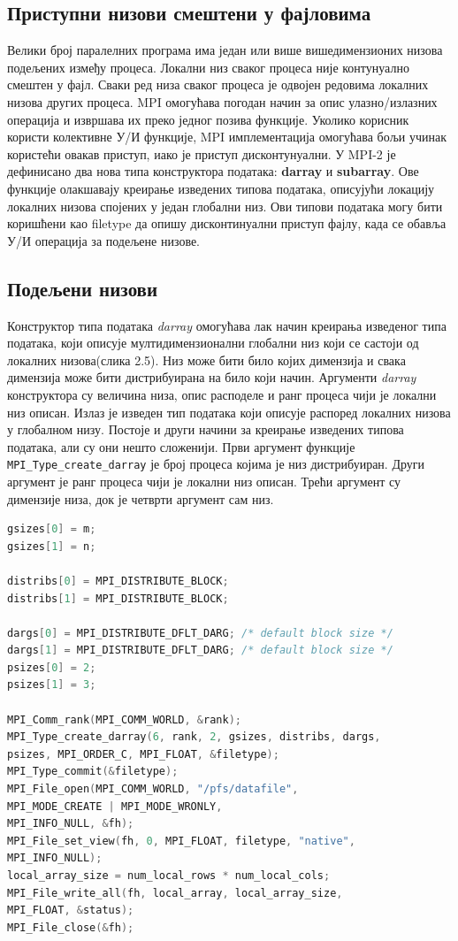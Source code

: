 \subsection{Приступни низови  смештени у фајловима}
Велики број паралелних програма има један или више вишедимензионих низова подељених између процеса. Локални низ сваког процеса није контунуално смештен у фајл. Сваки ред низа сваког процеса
је одвојен редовима локалних низова других процеса. MPI омогућава погодан начин за опис улазно/излазних операција и извршава их преко једног позива функције. Уколико корисник користи колективне У/И функције, MPI имплементација омогућава бољи учинак користећи овакав приступ, иако је приступ дисконтунуални. У MPI-2 је дефинисано два нова типа конструктора података: \textbf{darray} и \textbf{subarray}. Ове функције  олакшавају креирање изведених типова података, описујући локацију локалних низова спојених у један глобални низ. Ови типови података могу бити коришћени као filetype да опишу дисконтинуални приступ фајлу, када се обавља У/И операција за подељене низове.

\subsection{Подељени низови}
Конструктор типа података \textit{darray} омогућава лак начин креирања изведеног типа података, који описује мултидимензионални глобални низ који се састоји од локалних низова(слика 2.5). Низ може бити било којих димензија и свака димензија може бити дистрибуирана на било који начин. Аргументи \textit{darray} конструктора су величина низа, опис расподеле  и ранг процеса чији је локални низ описан. Излаз је изведен тип података који описује распоред локалних низова у глобалном низу. Постоје и други начини за креирање изведених типова података, али су они нешто сложенији.
Први аргумент функције \texttt{MPI\_Type\_create\_darray} је број процеса којима је низ дистрибуиран. Други аргумент је ранг процеса чији је локални низ описан. Трећи аргумент су димензије низа, док је четврти аргумент сам низ.

\begin{lstlisting}[style=nonumbers,frame=single,language=C, caption= Део MPI програма са подељеним низовима]
gsizes[0] = m;
gsizes[1] = n;

distribs[0] = MPI_DISTRIBUTE_BLOCK;
distribs[1] = MPI_DISTRIBUTE_BLOCK;

dargs[0] = MPI_DISTRIBUTE_DFLT_DARG; /* default block size */
dargs[1] = MPI_DISTRIBUTE_DFLT_DARG; /* default block size */
psizes[0] = 2;
psizes[1] = 3;

MPI_Comm_rank(MPI_COMM_WORLD, &rank);
MPI_Type_create_darray(6, rank, 2, gsizes, distribs, dargs,
psizes, MPI_ORDER_C, MPI_FLOAT, &filetype);
MPI_Type_commit(&filetype);
MPI_File_open(MPI_COMM_WORLD, "/pfs/datafile",
MPI_MODE_CREATE | MPI_MODE_WRONLY,
MPI_INFO_NULL, &fh);
MPI_File_set_view(fh, 0, MPI_FLOAT, filetype, "native",
MPI_INFO_NULL);
local_array_size = num_local_rows * num_local_cols;
MPI_File_write_all(fh, local_array, local_array_size,
MPI_FLOAT, &status);
MPI_File_close(&fh);
\end{lstlisting} 

